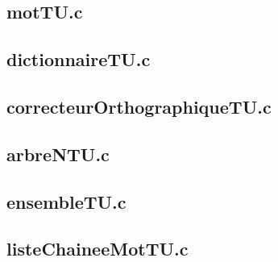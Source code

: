 
\subsection{motTU.c}

\bigskip

\subsection{dictionnaireTU.c}

\bigskip

\subsection{correcteurOrthographiqueTU.c}

\bigskip

\subsection{arbreNTU.c}

\bigskip

\subsection{ensembleTU.c}

\bigskip

\subsection{listeChaineeMotTU.c}


